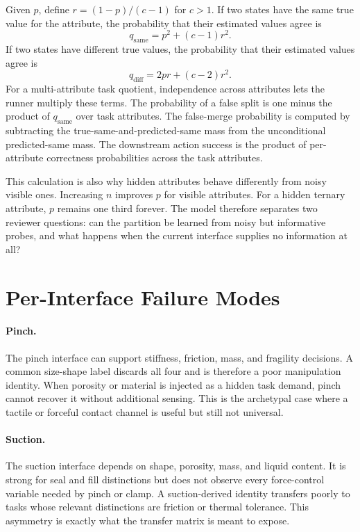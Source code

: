 \documentclass{article}
\begin{document}
Given $p$, define $r=(1-p)/(c-1)$ for $c>1$.
If two states have the same true value for the attribute, the probability that their estimated values agree is
\begin{equation}
    q_{\mathrm{same}} = p^2 + (c-1)r^2.
\end{equation}
If two states have different true values, the probability that their estimated values agree is
\begin{equation}
    q_{\mathrm{diff}} = 2pr + (c-2)r^2.
\end{equation}
For a multi-attribute task quotient, independence across attributes lets the runner multiply these terms.
The probability of a false split is one minus the product of $q_{\mathrm{same}}$ over task attributes.
The false-merge probability is computed by subtracting the true-same-and-predicted-same mass from the unconditional predicted-same mass.
The downstream action success is the product of per-attribute correctness probabilities across the task attributes.

This calculation is also why hidden attributes behave differently from noisy visible ones.
Increasing $n$ improves $p$ for visible attributes.
For a hidden ternary attribute, $p$ remains one third forever.
The model therefore separates two reviewer questions:
can the partition be learned from noisy but informative probes, and what happens when the current interface supplies no information at all?

\section{Per-Interface Failure Modes}

\paragraph{Pinch.}
The pinch interface can support stiffness, friction, mass, and fragility decisions.
A common size-shape label discards all four and is therefore a poor manipulation identity.
When porosity or material is injected as a hidden task demand, pinch cannot recover it without additional sensing.
This is the archetypal case where a tactile or forceful contact channel is useful but still not universal.

\paragraph{Suction.}
The suction interface depends on shape, porosity, mass, and liquid content.
It is strong for seal and fill distinctions but does not observe every force-control variable needed by pinch or clamp.
A suction-derived identity transfers poorly to tasks whose relevant distinctions are friction or thermal tolerance.
This asymmetry is exactly what the transfer matrix is meant to expose.
\end{document}
